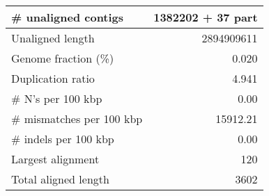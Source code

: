 \documentclass[12pt,a4paper]{article}
\begin{document}
\begin{table}[ht]
\begin{center}
\begin{tabular}{|l*{1}{|r}|}
\# unaligned contigs & 1382202 + 37 part \\ \hline
Unaligned length & 2894909611 \\ \hline
Genome fraction (\%) & 0.020 \\ \hline
Duplication ratio & 4.941 \\ \hline
\# N's per 100 kbp & 0.00 \\ \hline
\# mismatches per 100 kbp & 15912.21 \\ \hline
\# indels per 100 kbp & 0.00 \\ \hline
Largest alignment & 120 \\ \hline
Total aligned length & 3602 \\ \hline
\end{tabular}
\end{center}
\end{table}
\end{document}
